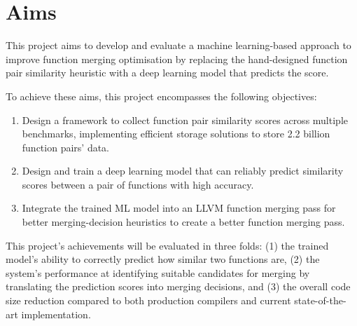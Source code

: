\section{Aims} \label{section:aims}
This project aims to develop and evaluate a machine learning-based approach to improve function merging optimisation by replacing the hand-designed function pair similarity heuristic with a deep learning model that predicts the score. 

To achieve these aims, this project encompasses the following objectives:
\begin{enumerate}
    \item Design a framework to collect function pair similarity scores across multiple benchmarks, implementing efficient storage solutions to store 2.2 billion function pairs' data.
    \item Design and train a deep learning model that can reliably predict similarity scores between a pair of functions with high accuracy.
    \item Integrate the trained ML model into an LLVM function merging pass for better merging-decision heuristics to create a better function merging pass.
\end{enumerate}

This project's achievements will be evaluated in three folds: (1) the trained model's ability to correctly predict how similar two functions are, (2) the system's performance at identifying suitable candidates for merging by translating the prediction scores into merging decisions, and (3) the overall code size reduction compared to both production compilers and current state-of-the-art implementation.


